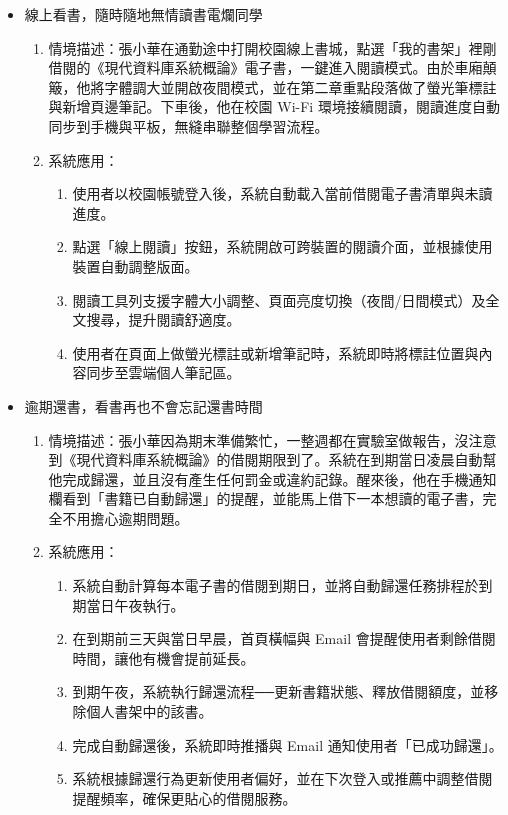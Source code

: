 \begin{itemize}
    \item 線上看書，隨時隨地無情讀書電爛同學
        \begin{enumerate}
            \item 情境描述：張小華在通勤途中打開校園線上書城，點選「我的書架」裡剛借閱的《現代資料庫系統概論》電子書，一鍵進入閱讀模式。由於車廂顛簸，他將字體調大並開啟夜間模式，並在第二章重點段落做了螢光筆標註與新增頁邊筆記。下車後，他在校園 Wi-Fi 環境接續閱讀，閱讀進度自動同步到手機與平板，無縫串聯整個學習流程。
            \item 系統應用：
                \begin{enumerate}
                    \item 使用者以校園帳號登入後，系統自動載入當前借閱電子書清單與未讀進度。
                    \item 點選「線上閱讀」按鈕，系統開啟可跨裝置的閱讀介面，並根據使用裝置自動調整版面。
                    \item 閱讀工具列支援字體大小調整、頁面亮度切換（夜間/日間模式）及全文搜尋，提升閱讀舒適度。
                    \item 使用者在頁面上做螢光標註或新增筆記時，系統即時將標註位置與內容同步至雲端個人筆記區。
                \end{enumerate}
        \end{enumerate}
         
    \item 逾期還書，看書再也不會忘記還書時間
        \begin{enumerate}
            \item 情境描述：張小華因為期末準備繁忙，一整週都在實驗室做報告，沒注意到《現代資料庫系統概論》的借閱期限到了。系統在到期當日凌晨自動幫他完成歸還，並且沒有產生任何罰金或違約記錄。醒來後，他在手機通知欄看到「書籍已自動歸還」的提醒，並能馬上借下一本想讀的電子書，完全不用擔心逾期問題。
            \item 系統應用：
                \begin{enumerate}
                    \item 系統自動計算每本電子書的借閱到期日，並將自動歸還任務排程於到期當日午夜執行。
                    \item 在到期前三天與當日早晨，首頁橫幅與 Email 會提醒使用者剩餘借閱時間，讓他有機會提前延長。
                    \item 到期午夜，系統執行歸還流程──更新書籍狀態、釋放借閱額度，並移除個人書架中的該書。
                    \item 完成自動歸還後，系統即時推播與 Email 通知使用者「已成功歸還」。
                    \item 系統根據歸還行為更新使用者偏好，並在下次登入或推薦中調整借閱提醒頻率，確保更貼心的借閱服務。
                \end{enumerate}
        \end{enumerate}
\end{itemize}
